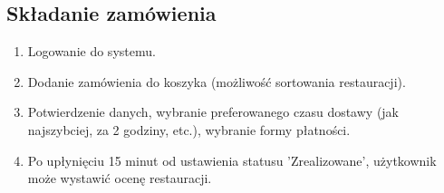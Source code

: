 \documentclass[12pt, a4paper, oneside]{article}
\begin{document}
\subsection{Składanie zamówienia}
\begin{enumerate}
\item Logowanie do systemu.
\item Dodanie zamówienia do koszyka (możliwość sortowania restauracji).
\item Potwierdzenie danych, wybranie preferowanego czasu dostawy (jak najszybciej, za 2 godziny, etc.), wybranie formy płatności.
\item Po upłynięciu 15 minut od ustawienia statusu 'Zrealizowane', użytkownik może wystawić ocenę restauracji.
\end{enumerate}
\end{document}
